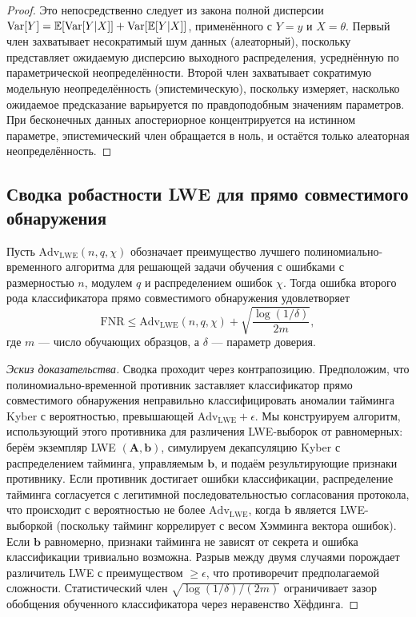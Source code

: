 \begin{proof}
Это непосредственно следует из закона полной дисперсии $\mathrm{Var}[Y]=\mathbb{E}[\mathrm{Var}[Y|X]]+\mathrm{Var}[\mathbb{E}[Y|X]]$, применённого с $Y=y$ и $X=\theta$. Первый член захватывает несократимый шум данных (алеаторный), поскольку представляет ожидаемую дисперсию выходного распределения, усреднённую по параметрической неопределённости. Второй член захватывает сократимую модельную неопределённость (эпистемическую), поскольку измеряет, насколько ожидаемое предсказание варьируется по правдоподобным значениям параметров. При бесконечных данных апостериорное концентрируется на истинном параметре, эпистемический член обращается в ноль, и остаётся только алеаторная неопределённость.
\end{proof}


\subsection{Сводка робастности LWE для прямо совместимого обнаружения}
\label{app:lwe_reduction}

\begin{proposition}
\label{prop:lwe}
Пусть $\mathrm{Adv}_{\mathrm{LWE}}(n,q,\chi)$ обозначает преимущество лучшего полиномиально-временного алгоритма для решающей задачи обучения с ошибками с размерностью $n$, модулем $q$ и распределением ошибок $\chi$. Тогда ошибка второго рода классификатора прямо совместимого обнаружения удовлетворяет
\begin{equation}
\mathrm{FNR} \le \mathrm{Adv}_{\mathrm{LWE}}(n,q,\chi) + \sqrt{\frac{\log(1/\delta)}{2m}},
\end{equation}
где $m$ --- число обучающих образцов, а $\delta$ --- параметр доверия.
\end{proposition}

\begin{proof}[Эскиз доказательства]
Сводка проходит через контрапозицию. Предположим, что полиномиально-временной противник заставляет классификатор прямо совместимого обнаружения неправильно классифицировать аномалии тайминга Kyber с вероятностью, превышающей $\mathrm{Adv}_{\mathrm{LWE}}+\epsilon$. Мы конструируем алгоритм, использующий этого противника для различения LWE-выборок от равномерных: берём экземпляр LWE $(\mathbf{A},\mathbf{b})$, симулируем декапсуляцию Kyber с распределением тайминга, управляемым $\mathbf{b}$, и подаём результирующие признаки противнику. Если противник достигает ошибки классификации, распределение тайминга согласуется с легитимной последовательностью согласования протокола, что происходит с вероятностью не более $\mathrm{Adv}_{\mathrm{LWE}}$, когда $\mathbf{b}$ является LWE-выборкой (поскольку тайминг коррелирует с весом Хэмминга вектора ошибок). Если $\mathbf{b}$ равномерно, признаки тайминга не зависят от секрета и ошибка классификации тривиально возможна. Разрыв между двумя случаями порождает различитель LWE с преимуществом $\ge\epsilon$, что противоречит предполагаемой сложности. Статистический член $\sqrt{\log(1/\delta)/(2m)}$ ограничивает зазор обобщения обученного классификатора через неравенство Хёфдинга.
\end{proof}


